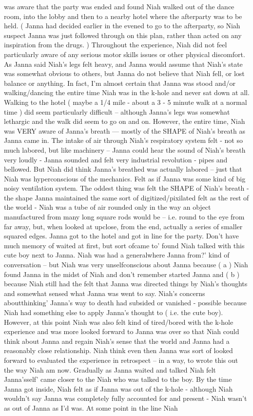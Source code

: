 \documentclass[12pt]{book}
\begin{document}
was aware that the party was ended and found Niah walked out of the dance room, into the lobby and then to a nearby hotel where the afterparty was to be held. ( Janna had decided earlier in the evened to go to the afterparty, so Niah suspect Janna was just followed through on this plan, rather than acted on any inspiration from the drugs. ) Throughout the experience, Niah did not feel particularly aware of any serious motor skills issues or other physical discomfort. As Janna said Niah's legs felt heavy, and Janna would assume that Niah's state was somewhat obvious to others, but Janna do not believe that Niah fell, or lost balance or anything. In fact, I'm almost certain that Janna was stood and/or walking/dancing the entire time Niah was in the k-hole and never sat down at all. Walking to the hotel ( maybe a 1/4 mile - about a 3 - 5 minute walk at a normal time ) did seem particularly difficult -- although Janna's legs was somewhat lethargic and the walk did seem to go on and on. However, the entire time, Niah was VERY aware of Janna's breath --- mostly of the SHAPE of Niah's breath as Janna came in. The intake of air through Niah's respiratory system felt - not so much labored, but like machinery -- Janna could hear the sound of Niah's breath very loudly - Janna sounded and felt very industrial revolution - pipes and bellowed. But Niah did think Janna's breathed was actually labored -- just that Niah was hyperconscious of the mechanics. Felt as if Janna was some kind of big noisy ventilation system. The oddest thing was felt the SHAPE of Niah's breath - the shape Janna maintained the same sort of digitized/pixilated felt as the rest of the world - Niah was a tube of air rounded only in the way an object manufactured from many long square rods would be -- i.e. round to the eye from far away, but, when looked at upclose, from the end, actually a series of smaller squared edges. Janna got to the hotel and got in line for the party. Don't have much memory of waited at first, but sort ofcame to' found Niah talked with this cute boy next to Janna. Niah was had a generalwhere Janna from?' kind of conversation -- but Niah was very unselfconscious about Janna because ( a ) Niah found Janna in the midst of Niah and don't remember started Janna and ( b ) because Niah still had the felt that Janna was directed things by Niah's thoughts and somewhat sensed what Janna was went to say. Niah's concerns aboutthinking' Janna's way to death had subsided or vanished - possible because Niah had something else to apply Janna's thought to ( i.e. the cute boy). However, at this point Niah was also felt kind of tired/bored with the k-hole experience and was more looked forward to Janna was over so that Niah could think about Janna and regain Niah's sense that the world and Janna had a reasonably close relationship. Niah think even then Janna was sort of looked forward to evaluated the experience in retrospect -- in a way, to wrote this out the way Niah am now. Gradually as Janna waited and talked Niah felt Janna'sself' came closer to the Niah who was talked to the boy. By the time Janna got inside, Niah felt as if Janna was out of the k-hole - although Niah wouldn't say Janna was completely fully accounted for and present - Niah wasn't as out of Janna as I'd was. At some point in the line Niah 
\end{document}
